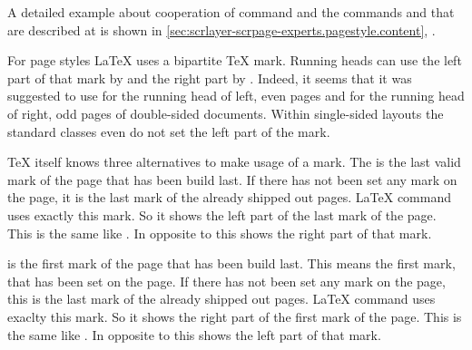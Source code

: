 \begin{Example}
\begin{lstcode}
  \blinddocument
  
\end{lstcode}
\end{Example}
\else %
  \par %
  A detailed example about cooperation of command 
  and the commands  and 
  that are described at  is shown in
  \autoref{sec:scrlayer-scrpage-experts.pagestyle.content},
  .%
\fi %
%
\EndIndexGroup


\begin{Declaration}
\end{Declaration}
For page styles \LaTeX{} uses a bipartite
\TeX{} mark. Running heads can use the left part of that mark by
 and the right
part by
. Indeed, it
seems that it was suggested to use  for the running head of
left, even pages and  for the running head of right, odd
pages of double-sided documents. Within single-sided layouts the standard
classes even do not set the left part of the mark.

\TeX{} itself knows three alternatives to make usage of a mark. The
 is the last valid mark of the page that has been build
last. If there has not been set any mark on the page, it is the last mark of the
already shipped out pages. \LaTeX{} command  uses exactly this
mark. So it shows the left part of the last mark of the page. This is the same
like . In opposite to this  shows the
right part of that mark.

 is the first mark of the page that has been build last. This
means the first mark, that has been set on the page. If there has not been set
any mark on the page, this is the last mark of the already shipped out
pages. \LaTeX{} command  uses exaclty this mark. So it shows
the right part of the first mark of the page. This is the same like
. In opposite to this  shows the
left part of that mark.

